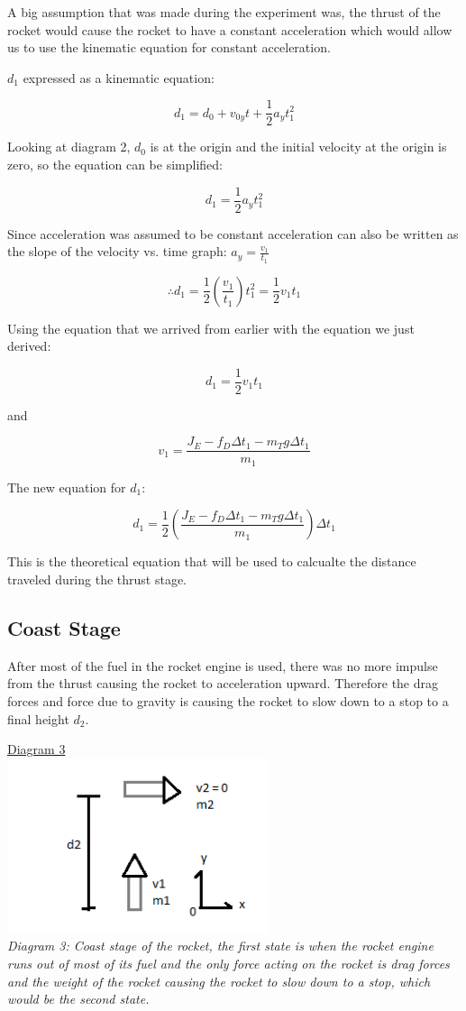 \documentclass[aps,letterpaper,11pt]{revtex4}
\begin{document}
A big assumption that was made during the experiment was, the thrust of the rocket would cause the rocket to have a constant acceleration which would allow us to use the kinematic equation for constant acceleration.

$d_1$ expressed as a kinematic equation:

$$ d_1 = d_0 + v_{0y}t + \frac{1}{2}a_yt_1^2$$

Looking at diagram 2, $d_0$ is at the origin and the initial velocity at the origin is zero, so the equation can be simplified:

$$ d_1 = \frac{1}{2}a_{y}t_1^2$$



Since acceleration was assumed to be constant acceleration can also be written as the slope of the velocity vs. time graph: $a_y = \frac{v_1}{t_1}$

$$ \therefore d_1 = \frac{1}{2}(\frac{v_1}{t_1})t_1^2 = \frac{1}{2}v_1t_1$$

Using the equation that we arrived from earlier with the equation we just derived: 

$$ d_1 = \frac{1}{2}v_1t_1 $$ 

and

$$  v_1 = \frac{J_E - f_D\Delta t_1 - m_Tg\Delta t_1}{m_1}$$

The new equation for $d_1$:

$$ d_1 = \frac{1}{2}(\frac{J_E - f_D\Delta t_1 - m_Tg\Delta t_1}{m_1})\Delta t_1$$

This is the theoretical equation that will be used to calcualte the distance traveled during the thrust stage.

\subsection{Coast Stage}

After most of the fuel in the rocket engine is used, there was no more impulse from the thrust causing the rocket to acceleration upward. Therefore the drag forces and force due to gravity is causing the rocket to slow down to a stop to a final height $d_2$.

\begin{center}
\underline{Diagram 3}\\
\includegraphics[width=3in]{CalculatingD2.png}\\
\textit{Diagram 3: Coast stage of the rocket, the first state is when the rocket engine runs out of most of its fuel and the only force acting on the rocket is drag forces and the weight of the rocket causing the rocket to slow down to a stop, which would be the second state.}
\end{center}
\end{document}
